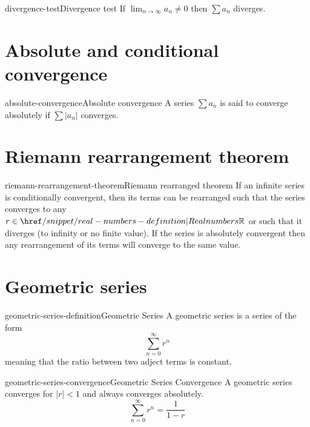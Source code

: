 \documentclass[preview]{standalone}
\begin{document}
\begin{snippettheorem}{divergence-test}{Divergence test}
    If \(\lim_{n \to \infty} a_n \neq 0\) then \(\sum a_n\) diverges.
\end{snippettheorem}

\section{Absolute and conditional convergence}

\begin{snippetdefinition}{absolute-convergence}{Absolute convergence}
    A series \(\sum a_n\) is said to converge absolutely if
    \(\sum |a_n|\) converges.
\end{snippetdefinition}



\section{Riemann rearrangement theorem}

\begin{snippettheorem}{riemann-rearrangement-theorem}{Riemann rearranged theorem}
    If an infinite series is conditionally convergent, then its terms can be rearranged such that
    the series converges to any \(r\in \realnumbers\) or such that it diverges (to infinity or no finite value).
    If the series is absolutely convergent then any rearrangement of its terms will converge to the same value.
\end{snippettheorem}

\section{Geometric series}

\begin{snippetdefinition}{geometric-series-definition}{Geometric Series}
    A geometric series is a series of the form
    \[
        \sum_{n=0}^\infty r^n
    \]
    meaning that the ratio between two adject terms is constant.
\end{snippetdefinition}

\begin{snippettheorem}{geometric-series-convergence}{Geometric Series Convergence}
    A geometric series converges for \(|r| < 1\) and always converges absolutely.
    \[
        \sum_{n=0}^\infty r^n = \frac{1}{1-r}
    \]
\end{snippettheorem}
\end{document}
